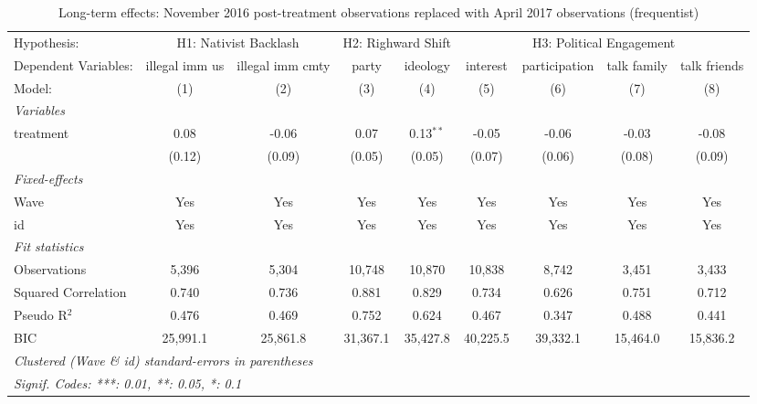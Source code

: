 
\begin{table}[htbp]
   \centering
   \begin{threeparttable}[b]
      \caption{\label{tab:long_term} Long-term effects: November 2016 post-treatment observations replaced with April 2017 observations (frequentist)}
      \begin{tabular}{lcccccccc}
         \tabularnewline \midrule \midrule
         Hypothesis: & \multicolumn{2}{c}{H1: Nativist Backlash} & \multicolumn{2}{c}{H2: Righward Shift} & \multicolumn{4}{c}{H3: Political Engagement} \\ 
         Dependent Variables: & illegal imm us & illegal imm cmty & party    & ideology    & interest & participation & talk family & talk friends\\  
         Model:               & (1)            & (2)              & (3)      & (4)         & (5)      & (6)           & (7)         & (8)\\  
         \midrule
         \emph{Variables}\\
         treatment            & 0.08           & -0.06            & 0.07     & 0.13$^{**}$ & -0.05    & -0.06         & -0.03       & -0.08\\   
                              & (0.12)         & (0.09)           & (0.05)   & (0.05)      & (0.07)   & (0.06)        & (0.08)      & (0.09)\\   
         \midrule
         \emph{Fixed-effects}\\
         Wave                 & Yes            & Yes              & Yes      & Yes         & Yes      & Yes           & Yes         & Yes\\  
         id                   & Yes            & Yes              & Yes      & Yes         & Yes      & Yes           & Yes         & Yes\\  
         \midrule
         \emph{Fit statistics}\\
         Observations         & 5,396          & 5,304            & 10,748   & 10,870      & 10,838   & 8,742         & 3,451       & 3,433\\  
         Squared Correlation  & 0.740          & 0.736            & 0.881    & 0.829       & 0.734    & 0.626         & 0.751       & 0.712\\  
         Pseudo R$^2$         & 0.476          & 0.469            & 0.752    & 0.624       & 0.467    & 0.347         & 0.488       & 0.441\\  
         BIC                  & 25,991.1       & 25,861.8         & 31,367.1 & 35,427.8    & 40,225.5 & 39,332.1      & 15,464.0    & 15,836.2\\  
         \midrule \midrule
         \multicolumn{9}{l}{\emph{Clustered (Wave \& id) standard-errors in parentheses}}\\
         \multicolumn{9}{l}{\emph{Signif. Codes: ***: 0.01, **: 0.05, *: 0.1}}\\
      \end{tabular}
      

\end{threeparttable}
\end{table}
